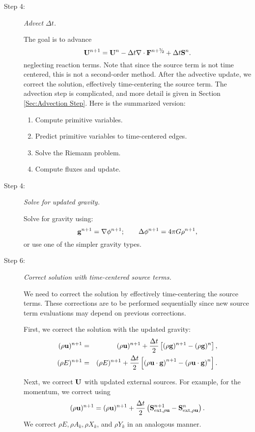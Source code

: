 \begin{description}
\item[Step 4:] {\em Advect $\Delta t$.}

The goal is to advance
\begin{equation}
\Ub^{n+1} = \Ub^n - \dt\nabla\cdot\Fb^\nph + \dt\Sb^n.
\end{equation}
neglecting reaction terms.  Note that since the source term is not
time centered, this is not a second-order method.  After the advective
update, we correct the solution, effectively time-centering the source
term. The advection step is complicated, and more detail is given in
Section \ref{Sec:Advection Step}.  Here is the summarized version:
\begin{enumerate}
\item Compute primitive variables.
\item Predict primitive variables to time-centered edges.
\item Solve the Riemann problem.
\item Compute fluxes and update.
\end{enumerate}
\item[Step 4:] {\em Solve for updated gravity.}

Solve for gravity using:
\begin{equation}
{\bf g}^{n+1} = \nabla\phi^{n+1}; \qquad \Delta\phi^{n+1} = 4\pi G\rho^{n+1},
\end{equation}
or use one of the simpler gravity types.
\item[Step 6:] {\em Correct solution with time-centered source terms.}

We need to correct the solution by effectively time-centering the
source terms.  These corrections are to be performed sequentially
since new source term evaluations may depend on previous corrections.

First, we correct the solution with the updated gravity:
\begin{eqnarray}
(\rho{\bf u})^{n+1} &=& (\rho{\bf u})^{n+1} + \frac{\Delta t}{2}\left[(\rho{\bf g})^{n+1} - (\rho{\bf g})^n\right], \\
(\rho E)^{n+1} &=& (\rho E)^{n+1} + \frac{\Delta t}{2}\left[\left(\rho{\bf u}\cdot{\bf g}\right)^{n+1} - \left(\rho{\bf u}\cdot{\bf g}\right)^n\right].
\end{eqnarray}

Next, we correct ${\bf U}$ with updated external sources.  For example,
for the momentum, we correct using
\begin{equation}
(\rho{\bf u})^{n+1} = (\rho{\bf u})^{n+1} + \frac{\Delta t}{2}\left({\bf S}_{{\rm ext},\rho{\bf u}}^{n+1} - {\bf S}_{{\rm ext},\rho{\bf u}}^n\right).
\end{equation}
We correct $\rho E, \rho A_k, \rho X_k$, and $\rho Y_k$ in an
analogous manner.


\end{description}
